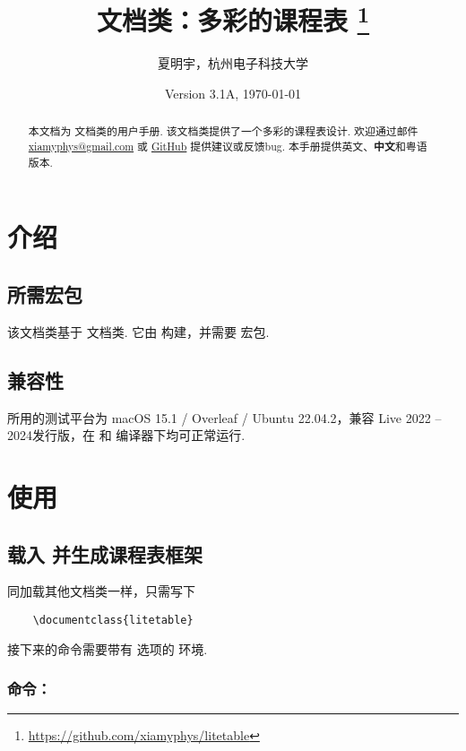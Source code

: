 \documentclass[letterpaper]{l3doc}
\title{
    \cls{litetable} 文档类：多彩的课程表
    \thanks{\url{https://github.com/xiamyphys/litetable}}
}
\author{夏明宇，杭州电子科技大学}
\affil{\href{mailto:xiamyphys@gmail.com}{xiamyphys@gmail.com}}
\date{Version 3.1A, \today}
\begin{document}
\maketitle

\begin{abstract}
    本文档为  文档类的用户手册. 该文档类提供了一个多彩的课程表设计. 欢迎通过邮件 \href{mailto:xiamyphys@gmail.com}{xiamyphys@gmail.com} 或 \href{https://github.com/xiamyphys/litetable/issues}{GitHub} 提供建议或反馈bug. 本手册提供英文、\textbf{中文}和粤语版本.
\end{abstract}

\section{介绍}

\subsection{所需宏包}

该文档类基于  文档类. 它由  构建，并需要  宏包. 

\subsection{兼容性}

所用的测试平台为 macOS 15.1 / Overleaf / Ubuntu 22.04.2，兼容 Live 2022 -- 2024发行版，在  和  编译器下均可正常运行.

\section{使用}

\subsection{载入  并生成课程表框架}

同加载其他文档类一样，只需写下

\begin{Verbatim}
    \documentclass{litetable}
\end{Verbatim}

接下来的命令需要带有  选项的  环境.

\subsubsection{命令：}
\end{document}
